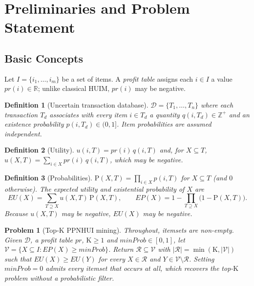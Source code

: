 \documentclass[pdflatex,sn-vancouver-num]{sn-jnl}
\theoremstyle{thmstyleone}%
\theoremstyle{thmstyletwo}%
\theoremstyle{thmstylethree}%
\newtheorem{definition}{Definition}%
\newtheorem{problem}{Problem}%
\newcommand{\DB}{\mathcal{D}}
\newcommand{\pr}{\mathit{pr}}
\newcommand{\qty}{q}
\newcommand{\prob}{p}
\newcommand{\uu}{u}
\newcommand{\EU}{\mathit{EU}}
\newcommand{\EP}{\mathit{EP}}
\newcommand{\minprob}{\mathit{minProb}}
\newcommand{\itemset}{X}
\newcommand{\Kk}{\mathrm{K}}
\begin{document}
\section{Preliminaries and Problem Statement}\label{sec:prelim}
\subsection{Basic Concepts}\label{subsec:defs}
Let $I=\{i_1,\dots,i_m\}$ be a set of items. A \emph{profit table} assigns each
$i\in I$ a value $\pr(i)\in\mathbb{R}$; unlike classical HUIM, $\pr(i)$ may be
negative.

\begin{definition}[Uncertain transaction database]\label{def:db}
$\DB=\{T_1,\dots,T_n\}$ where each transaction $T_d$ associates with every item
$i\in T_d$ a quantity $\qty(i,T_d)\in\mathbb{Z}^{+}$ and an existence probability
$\prob(i,T_d)\in(0,1]$. Item probabilities are assumed independent.
\end{definition}

\begin{definition}[Utility]\label{def:util}
$\uu(i,T)=\pr(i)\,\qty(i,T)$ and, for $\itemset\subseteq T$,
$\uu(\itemset,T)=\sum_{i\in \itemset}\pr(i)\,\qty(i,T)$, which may be
negative.
\end{definition}

\begin{definition}[Probabilities]\label{def:prob}
$\mathrm{P}(\itemset,T)=\prod_{i\in \itemset}\prob(i,T)$ for $\itemset\subseteq T$
(and $0$ otherwise). The \emph{expected utility} and \emph{existential
probability} of $\itemset$ are
\begin{equation}\label{eq:eu}
\EU(\itemset)=\!\!\sum_{T\supseteq \itemset}\!\!\uu(\itemset,T)\,\mathrm{P}(\itemset,T),
\qquad
\EP(\itemset)=1-\!\!\prod_{T\supseteq \itemset}\!\!\bigl(1-\mathrm{P}(\itemset,T)\bigr).
\end{equation}
Because $\uu(\itemset,T)$ may be negative, $\EU(\itemset)$ may be negative.
\end{definition}

\begin{problem}[Top-$\Kk$ PPNHUI mining]\label{prob:main}
Throughout, itemsets are non-empty. Given $\DB$, a profit table $\pr$,
$\Kk\ge 1$ and $\minprob\in[0,1]$, let
$\mathcal{V}=\{\itemset\subseteq I:\EP(\itemset)\ge\minprob\}$.
Return $\mathcal{R}\subseteq\mathcal{V}$ with
$|\mathcal{R}|=\min(\Kk,|\mathcal{V}|)$ such that
$\EU(\itemset)\ge\EU(Y)$ for every $\itemset\in\mathcal{R}$ and
$Y\in\mathcal{V}\setminus\mathcal{R}$. Setting $\minprob=0$ admits every
itemset that occurs at all, which recovers the top-$\Kk$ problem without
a probabilistic filter.
\end{problem}
\end{document}
